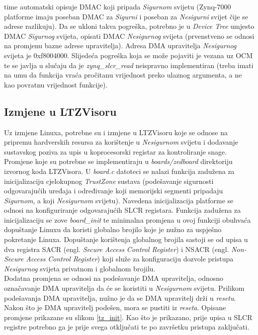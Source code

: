 \documentclass[times, utf8, diplomski, numeric]{fer}
\begin{document}
time automatski opisuje DMAC koji pripada \textit{Sigurnom} svijetu (Zynq-7000 platforme imaju poseban DMAC za \textit{Sigurni} i poseban za
\textit{Nesigurni} svijet čije se adrese razlikuju). Da se ukloni takva pogreška, potrebno je u \textit{Device Tree} umjesto DMAC
\textit{Sigurnog} svijeta, opisati DMAC \textit{Nesigurnog} svijeta (prvenstveno se odnosi na promjenu bazne adrese upravitelja).
Adresa DMA upravitelja \textit{Nesigurnog} svijeta je 0xf8004000.
Slijedeća pogreška koja se može pojaviti je vezana uz OCM te se javlja u slučaju da je \textit{zynq\_slcr\_read} neispravno
implementiran (treba imati na umu da funkcija vraća pročitanu vrijednost preko ulaznog argumenta, a ne kao povratnu vrijednost
funkcije).

\subsection{Izmjene u LTZVisoru}
Uz izmjene Linuxa, potrebne su i izmjene u LTZVisoru koje se odnose na pripremu hardverskih resursa za korištenje u \textit{Nesigurnom}
svijetu i dodavanje sustavskog poziva za upis u koprocesorski registar za kontroliranje snage. Promjene koje su potrebne se
implementiraju u \textit{boards/zedboard} direktoriju izvornog koda LTZVisora. U \textit{board.c} datoteci se nalazi funkcija
zadužena za inicijalizaciju cjelokupnog \textit{TrustZone} sustava (podešavanje sigurnosti odgovarajućih uređaja i određivanje
koji memorijski segmenti pripadaju \textit{Sigurnom}, a koji \textit{Nesigurnom} svijetu). Navedena inicijalizacija platforme se odnosi na
konfiguriranje odgovarajućih SLCR registara. Funkcija zadužena za inicijalizaciju se zove \textit{board\_init} te minimalna
promjena u ovoj funkciji obuhvaća dopuštanje Linuxu da koristi globalno brojilo koje je nužno za uspješno pokretanje Linuxa.
Dopuštanje korištenja globalnog brojila sastoji se od upisa u dva registra SACR (engl. \textit{Secure Access Control Register})
i NSACR (engl. \textit{Non-Secure Access Control Register}) koji služe za konfiguraciju dozvole pristupa \textit{Nesigurnog} svijeta
privatnom i globalnom brojilu.\\
Dodatna promjena se odnosi na podešavanje DMA upravitelja, odnosno označavanje DMA upravitelja da će se koristiti u \textit{Nesigurnom}
svijetu. Prilikom podešavanja DMA upravitelja, nužno je da se DMA upravitelj drži u \textit{resetu}. Nakon što je DMA upravitelj
podešen, mora se pustiti iz \textit{reseta}. Opisane promjene prikazane su slikom \ref{tz_init}.
Kao što je prikazano, prije upisa u SLCR registre potrebno ga je prije svega otključati te po završetku pristupa zaključati.
\end{document}

